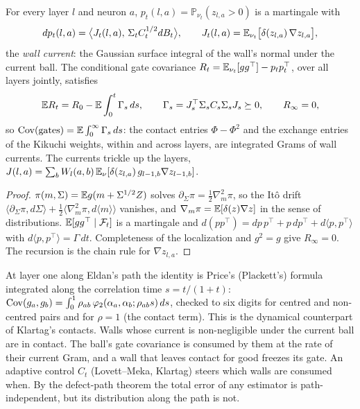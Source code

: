 \begin{theorem}\label{thm:consume}
For every layer $l$ and neuron $a$, $p_t(l,a)=\mathbb P_{\nu_t}(z_{l,a}>0)$ is a martingale with
\[
dp_t(l,a)=\big\langle J_t(l,a),\,\Sigma_tC_t^{1/2}dB_t\big\rangle,\qquad J_t(l,a)=\mathbb E_{\nu_t}\big[\delta(z_{l,a})\,\nabla z_{l,a}\big],
\]
the \emph{wall current}: the Gaussian surface integral of the wall's normal under the current ball. The conditional gate covariance
$R_t=\mathbb E_{\nu_t}[gg^{\top}]-p_tp_t^{\top}$, over all layers jointly, satisfies
\[
\mathbb E R_t=R_0-\mathbb E\int_0^t\Gamma_s\,ds,\qquad \Gamma_s=J_s^{\top}\Sigma_sC_s\Sigma_sJ_s\succeq0,\qquad R_\infty=0 ,
\]
so $\operatorname{Cov}(\text{gates})=\mathbb E\int_0^\infty\Gamma_s\,ds$: the contact entries $\Phi-\Phi^2$ and the exchange entries of the Kikuchi weights, within and
across layers, are integrated Grams of wall currents. The currents trickle up the layers,
$J(l,a)=\sum_bW_l(a,b)\,\mathbb E_\nu[\delta(z_{l,a})\,g_{l-1,b}\nabla z_{l-1,b}]$.
\end{theorem}
\begin{proof}
$\pi(m,\Sigma)=\mathbb E g(m+\Sigma^{1/2}Z)$ solves $\partial_\Sigma\pi=\tfrac12\nabla_m^2\pi$, so the It\^o drift $\langle\partial_\Sigma\pi,d\Sigma\rangle+\tfrac12\langle\nabla_m^2\pi,d\langle m\rangle\rangle$
vanishes, and $\nabla_m\pi=\mathbb E[\delta(z)\nabla z]$ in the sense of distributions. $\mathbb E[gg^{\top}\mid\mathcal F_t]$ is a martingale and
$d(pp^{\top})=dp\,p^{\top}+p\,dp^{\top}+d\langle p,p^{\top}\rangle$ with $d\langle p,p^{\top}\rangle=\Gamma\,dt$. Completeness of the localization and $g^2=g$ give
$R_\infty=0$. The recursion is the chain rule for $\nabla z_{l,a}$.
\end{proof}
At layer one along Eldan's path the identity is Price's (Plackett's) formula integrated along the correlation time $s=t/(1+t)$:
$\operatorname{Cov}(g_a,g_b)=\int_0^1\rho_{ab}\,\varphi_2(\alpha_a,\alpha_b;\rho_{ab}s)\,ds$, checked to six digits for centred and non-centred pairs and for $\rho=1$
(the contact term). This is the dynamical counterpart of Klartag's contacts. Walls whose current is non-negligible under the current
ball are in contact. The ball's gate covariance is consumed by them at the rate of their current Gram, and a wall that leaves contact
for good freezes its gate. An adaptive control $C_t$ (Lovett--Meka, Klartag) steers which walls are consumed when. By the defect-path
theorem the total error of any estimator is path-independent, but its distribution along the path is not.

